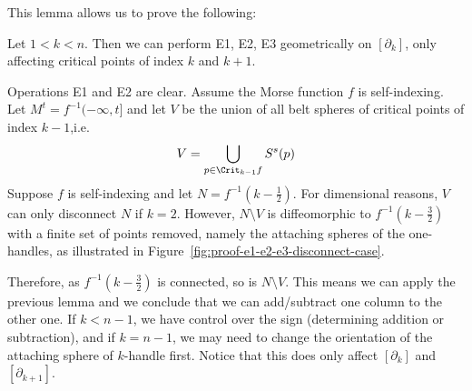 This lemma allows us to prove the following:
\begin{theorem}
    Let $1 < k < n$. Then we can perform E1, E2, E3 geometrically on $[\partial_k]$, only affecting critical points of index $k$ and $k+1$.
\end{theorem}
\begin{myproof}
    Operations E1 and E2 are clear.
    Assume the Morse function $f$ is self-indexing.
    Let  $M^{t} = f^{-1}(-\infty, t]$ and let $V$ be the union of all belt spheres of critical points of index $k-1$,i.e. \[
        V = \bigcup_{p \in \Crit_{k-1} f} S^{s}(p)
    \]
    Suppose $f$ is self-indexing and let $N = f^{-1}(k - \frac{1}{2})$.
    For dimensional reasons, $V$ can only disconnect $N$ if  $k = 2$.
    However, $N \setminus V$ is diffeomorphic to $f^{-1}(k - \frac{3}{2})$ with a finite set of points removed, namely the attaching spheres of the one-handles, as illustrated in Figure~\ref{fig:proof-e1-e2-e3-disconnect-case}.
    \begin{marginfigure}
        \centering
        \caption{In the case $k = 2$, the union of the belt spheres $V$ does disconnect $M^{3 / 2}$. However, it is diffeomorphic to $M^{ 1 / 2}$ with a finite set of points removed, and since $M^{ 1 / 2}$ is connected, so is  $M^{ 1 / 2} \setminus V$.}
        \label{fig:proof-e1-e2-e3-disconnect-case}
    \end{marginfigure}
    Therefore, as $f^{-1}(k- \frac{3}{2})$ is connected, so is $N \setminus V$.
    This means we can apply the previous lemma and we conclude that we can add/subtract one column to the other one.
    If $k < n-1$, we have control over the sign (determining addition or subtraction), and if $k = n-1$, we may need to change the orientation of the attaching sphere of  $k$-handle first.
    Notice that this does only affect $[\partial_k]$ and $[\partial_{k+1}]$.
\end{myproof}

